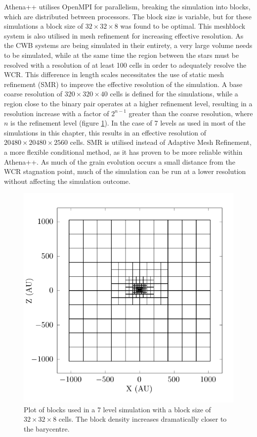 Athena++ utilises OpenMPI for parallelism, breaking the simulation into blocks, which are distributed between processors.
The block size is variable, but for these simulations a block size of $32\times 32 \times 8$ was found to be optimal.
This meshblock system is also utilised in mesh refinement for increasing effective resolution.
As the CWB systems are being simulated in their entirety, a very large volume needs to be simulated, while at the same time the region between the stars must be resolved with a resolution of at least 100 cells in order to adequately resolve the WCR.
This difference in length scales necessitates the use of static mesh refinement (SMR) to improve the effective resolution of the simulation.
A base coarse resolution of $320 \times 320 \times 40$ cells is defined for the simulations, while a region close to the binary pair operates at a higher refinement level, resulting in a resolution increase with a factor of $2^{n-1}$ greater than the coarse resolution, where $n$ is the refinement level (figure \ref{fig:smr-grid}).
In the case of 7 levels as used in most of the simulations in this chapter, this results in an effective resolution of $20480 \times 20480 \times 2560$ cells.
SMR is utilised instead of Adaptive Mesh Refinement, a more flexible conditional method, as it has proven to be more reliable within Athena++.
As much of the grain evolution occurs a small distance from the WCR stagnation point, much of the simulation can be run at a lower resolution without affecting the simulation outcome.

\begin{figure}
  \centering
  \includegraphics{assets/mesh/gridxy.pdf}
  \caption[Static mesh refinement example]{Plot of blocks used in a 7 level simulation with a block size of $32\times 32 \times 8$ cells. The block density increases dramatically closer to the barycentre.}
  \label{fig:smr-grid}
\end{figure}

